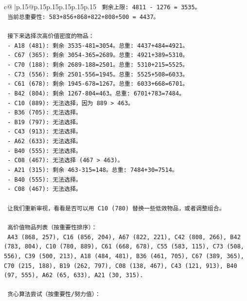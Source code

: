 \documentclass{article}
\begin{document}
{\begin{supertabular}{c@{$\;$}|p{.15\linewidth}@{}p{.15\linewidth}p{.15\linewidth}p{.15\linewidth}p{.15\linewidth}p{.15\linewidth}}
{{{\texttt{   剩余上限: 4811 {-} 1276 = 3535。} \\
\texttt{   当前总重要性: 583+856+868+822+808+500 = 4437。} \\
\\ 
\texttt{   接下来选择次高价值密度的物品：} \\
\texttt{   {-} A18 (481): 剩余 3535{-}481=3054。总重: 4437+484=4921。} \\
\texttt{   {-} C67 (365): 剩余 3054{-}365=2689。总重: 4921+389=5310。} \\
\texttt{   {-} C70 (188): 剩余 2689{-}188=2501。总重: 5310+215=5525。} \\
\texttt{   {-} C73 (556): 剩余 2501{-}556=1945。总重: 5525+508=6033。} \\
\texttt{   {-} C61 (678): 剩余 1945{-}678=1267。总重: 6033+668=6701。} \\
\texttt{   {-} B42 (804): 剩余 1267{-}804=463。总重: 6701+783=7484。} \\
\texttt{   {-} C10 (889): 无法选择，因为 889 > 463。} \\
\texttt{   {-} B36 (705): 无法选择。} \\
\texttt{   {-} B19 (797): 无法选择。} \\
\texttt{   {-} C43 (913): 无法选择。} \\
\texttt{   {-} A62 (633): 无法选择。} \\
\texttt{   {-} B40 (555): 无法选择。} \\
\texttt{   {-} C08 (467): 无法选择 (467 > 463)。} \\
\texttt{   {-} A21 (315): 剩余 463{-}315=148。总重: 7484+30=7514。} \\
\texttt{   {-} B40 (555): 无法选择。} \\
\texttt{   {-} C08 (467): 无法选择。} \\
\\ 
\texttt{   让我们重新审视，看看是否可以用 C10 (780) 替换一些低效物品，或者调整组合。} \\
\\ 
\texttt{   高价值物品列表（按重要性排序）：} \\
\texttt{   A43 (868, 257), C16 (856, 204), A67 (822, 221), C42 (808, 266), B42 (783, 804), C10 (780, 889), C61 (668, 678), C55 (583, 115), C73 (508, 556), C39 (500, 213), A18 (484, 481), B36 (461, 705), C67 (389, 365), C70 (215, 188), B19 (262, 797), C08 (138, 467), C43 (121, 913), B40 (97, 555), A62 (65, 633), A21 (30, 315).} \\
\\ 
\texttt{   贪心算法尝试（按重要性/努力值）：} \\
}}}
\end{supertabular}}
\end{document}
